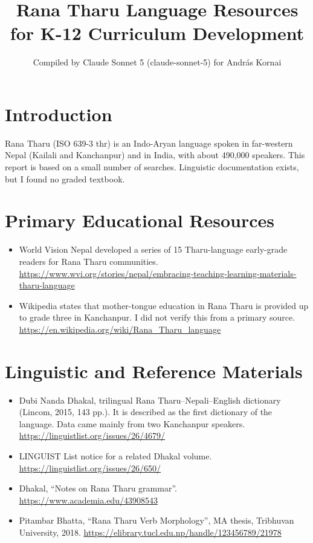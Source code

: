 \documentclass[12pt]{article}
\title{Rana Tharu Language Resources for K-12 Curriculum Development}
\author{Compiled by Claude Sonnet 5 (claude-sonnet-5) for Andr\'as Kornai}
\date{}
\begin{document}
\maketitle

\section{Introduction}
Rana Tharu (ISO 639-3 thr) is an Indo-Aryan language spoken in far-western Nepal (Kailali and Kanchanpur) and in India, with about 490,000 speakers. This report is based on a small number of searches. Linguistic documentation exists, but I found no graded textbook.

\section{Primary Educational Resources}
\begin{itemize}
\item World Vision Nepal developed a series of 15 Tharu-language early-grade readers for Rana Tharu communities. \url{https://www.wvi.org/stories/nepal/embracing-teaching-learning-materials-tharu-language}
\item Wikipedia states that mother-tongue education in Rana Tharu is provided up to grade three in Kanchanpur. I did not verify this from a primary source. \url{https://en.wikipedia.org/wiki/Rana_Tharu_language}
\end{itemize}

\section{Linguistic and Reference Materials}
\begin{itemize}
\item Dubi Nanda Dhakal, trilingual Rana Tharu--Nepali--English dictionary (Lincom, 2015, 143 pp.). It is described as the first dictionary of the language. Data came mainly from two Kanchanpur speakers. \url{https://linguistlist.org/issues/26/4679/}
\item LINGUIST List notice for a related Dhakal volume. \url{https://linguistlist.org/issues/26/650/}
\item Dhakal, ``Notes on Rana Tharu grammar''. \url{https://www.academia.edu/43908543}
\item Pitambar Bhatta, ``Rana Tharu Verb Morphology'', MA thesis, Tribhuvan University, 2018. \url{https://elibrary.tucl.edu.np/handle/123456789/21978}
\end{itemize}
\end{document}

